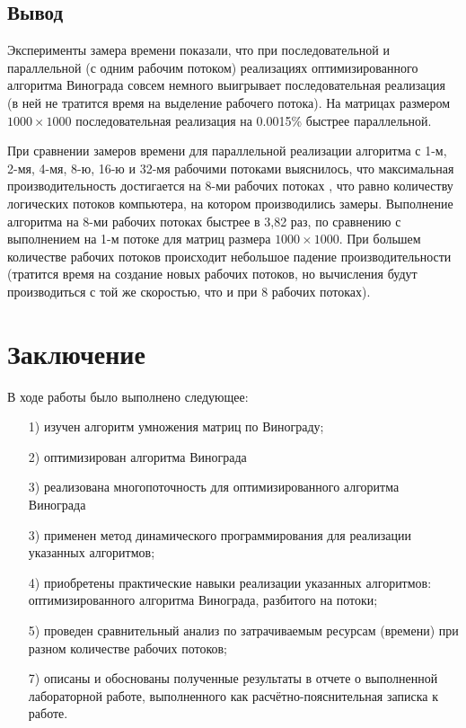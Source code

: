 \documentclass[a4paper,14pt]{article}
\begin{document}
     
        
       \subsection*{Вывод}
       Эксперименты замера времени показали, что при последовательной и параллельной (с одним рабочим потоком) реализациях оптимизированного алгоритма Винограда совсем немного выигрывает последовательная реализация (в ней не тратится время на выделение рабочего потока). На матрицах размером $1000 \times 1000$ последовательная реализация на 0.0015\% быстрее параллельной.
       
        При сравнении замеров времени для параллельной реализации алгоритма с 1-м, 2-мя, 4-мя, 8-ю, 16-ю и 32-мя рабочими потоками выяснилось, что максимальная производительность достигается на 8-ми рабочих потоках , что равно количеству логических потоков компьютера, на котором производились замеры. Выполнение алгоритма на 8-ми рабочих потоках быстрее в 3,82 раз, по сравнению с выполнением на 1-м потоке для матриц размера $1000 \times 1000$. При большем количестве рабочих потоков происходит небольшое падение производительности (тратится время на создание новых рабочих потоков, но вычисления будут производиться с той же скоростью, что и при 8 рабочих потоках).
        
    

\pagebreak
\section*{Заключение}
	В ходе работы было выполнено следующее:
	\begin{enumerate} 
	\item[1)] изучен алгоритм умножения матриц по Винограду;
	\item[2)] оптимизирован алгоритма Винограда
	\item[3)] реализована многопоточность для оптимизированного алгоритма Винограда
	\item[3)] применен метод динамического программирования для реализации указанных алгоритмов;
	\item[4)] приобретены практические навыки реализации указанных алгоритмов: оптимизированного алгоритма Винограда, разбитого на потоки;
	\item[5)] проведен сравнительный анализ по затрачиваемым ресурсам (времени) при разном количестве рабочих потоков;
	\item[7)] описаны и обоснованы полученные результаты в отчете о выполненной лабораторной работе, выполненного как расчётно-пояснительная записка к работе. 
\end{enumerate} 
\end{document}
